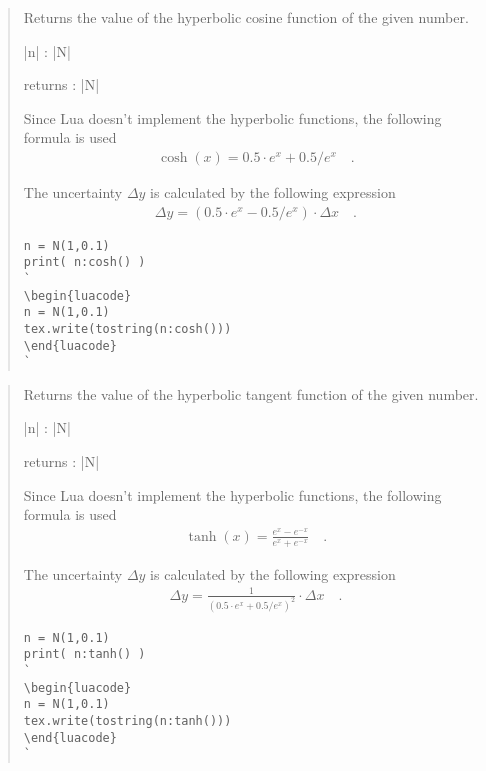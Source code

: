 \documentclass{ltxdoc}
\begin{document}
\begin{quote}
  Returns the value of the hyperbolic cosine function of the given number.

  \begin{description}
  \item |n| : |N|

  \item returns : |N|
  \end{description}

  Since Lua doesn't implement the hyperbolic functions, the following formula is used
  \begin{align*}
    \cosh(x) = 0.5 \cdot e^x + 0.5 / e^x  \quad.
  \end{align*}

  The uncertainty $\Delta y$ is calculated by the following expression
  \begin{align*}
    \Delta y = \left( 0.5 \cdot e^x - 0.5 / e^x \right) \cdot \Delta x \quad.
  \end{align*}

\begin{lstlisting}
n = N(1,0.1)
print( n:cosh() )
`
\begin{luacode}
n = N(1,0.1)
tex.write(tostring(n:cosh()))
\end{luacode}
`
\end{lstlisting}

\end{quote}



\begin{quote}
  Returns the value of the hyperbolic tangent function of the given number.

  \begin{description}
  \item |n| : |N|

  \item returns : |N|
  \end{description}

  Since Lua doesn't implement the hyperbolic functions, the following formula is used
  \begin{align*}
    \tanh(x) = \frac{e^x - e^{-x}}{e^x + e^{-x}} \quad.
  \end{align*}

  The uncertainty $\Delta y$ is calculated by the following expression
  \begin{align*}
    \Delta y = \frac{1}{\left( 0.5 \cdot e^x + 0.5 / e^x \right)^2} \cdot \Delta x \quad.
  \end{align*}



\begin{lstlisting}
n = N(1,0.1)
print( n:tanh() )
`
\begin{luacode}
n = N(1,0.1)
tex.write(tostring(n:tanh()))
\end{luacode}
`
\end{lstlisting}

\end{quote}
\end{document}
